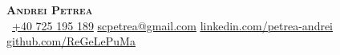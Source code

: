 \begin{center}
    \textbf{\Huge \scshape Andrei Petrea} \\ \vspace{10pt}
     \ \small \href{tel:+40725195189}{+40 725 195 189} \quad
    \href{mailto:scpetrea@gmail.com}{ \underline{scpetrea@gmail.com}} \quad
    \href{https://www.linkedin.com/in/petrea-andrei/}{ \underline{linkedin.com/petrea-andrei}} \quad
    \href{https://github.com/ReGeLePuMa}{ \underline{github.com/ReGeLePuMa}}
\end{center}